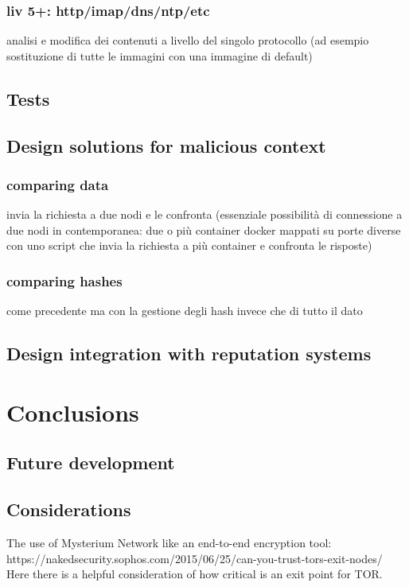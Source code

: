 \documentclass[]{article}
\begin{document}
		\subsubsection{liv 5+: http/imap/dns/ntp/etc}
			analisi e modifica dei contenuti a livello del singolo protocollo (ad esempio sostituzione di tutte le immagini con una immagine di default)
			
	\subsection{Tests}
	\subsection{Design solutions for malicious context}
		\subsubsection{comparing data}
		invia la richiesta a due nodi e le confronta (essenziale possibilità di connessione a due nodi in contemporanea: due o più container docker mappati su porte diverse con uno script che invia la richiesta a più container e confronta le risposte)

		\subsubsection{comparing hashes}
		come precedente ma con la gestione degli hash invece che di tutto il dato


	\subsection{Design integration with reputation systems}

		
\section{Conclusions}
	\subsection{Future development}
	\subsection{Considerations}

	The use of Mysterium Network like an end-to-end encryption tool: https://nakedsecurity.sophos.com/2015/06/25/can-you-trust-tors-exit-nodes/
	Here there is a helpful consideration of how critical is an exit point for TOR.
\end{document}
